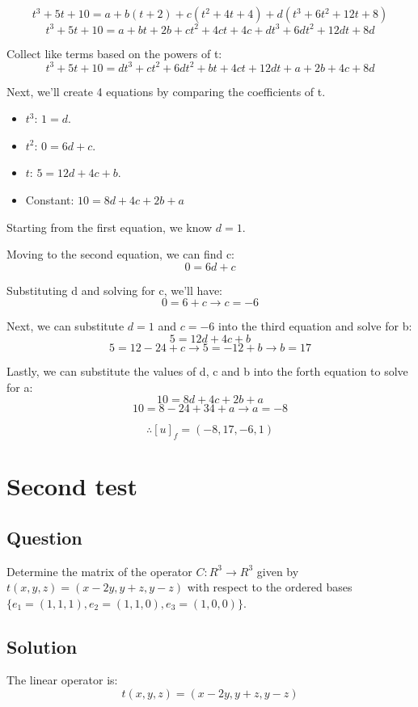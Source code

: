 \documentclass{book}
\begin{document}
\[t^3 + 5t + 10 = a + b (t + 2) + c (t^2  + 4t + 4) + d(t^3 + 6t^2 + 12t + 8)\]
\[t^3 + 5t + 10 = a + bt + 2b + ct^2  + 4ct + 4c + dt^3 + 6dt^2 + 12dt + 8d\]

Collect like terms based on the powers of t:
\[t^3 + 5t + 10 = dt^3 + ct^2 + 6dt^2 + bt + 4ct + 12dt + a + 2b  + 4c + 8d\]

Next, we'll create 4 equations by comparing the coefficients of t.

\begin{itemize}
	\item \(t^3\): \(1 = d\).
	\item \(t^2\): \(0 = 6d + c\).
	\item \(t\): \(5 = 12d + 4c + b\).
	\item Constant: \(10 = 8d + 4c + 2b + a\)
\end{itemize}

Starting from the first equation, we know \(d = 1\).

Moving to the second equation, we can find c:
\[0 = 6d + c\]

Substituting d and solving for c, we'll have:
\[0 = 6 + c \rightarrow c = -6\]

Next, we can substitute \(d = 1\) and \(c = -6\) into the third equation and solve for b:
\[5 = 12d + 4c + b\]
\[5 = 12 - 24 + c \rightarrow 5 = -12 + b \rightarrow b = 17\]

Lastly, we can substitute the values of d, c and b into the forth equation to solve for a:
\[10 = 8d + 4c + 2b + a\]
\[10 = 8 - 24 + 34 + a \rightarrow a = -8\]

\[\therefore {[u]}_f = (-8, 17, -6, 1)\]

\section{Second test}
\subsection{Question}
Determine the matrix of the operator \(C: R^3 \to R^3\) given by \(t(x, y, z) = (x - 2y, y + z, y - z)\) with respect to the ordered bases \(\{e_1 = (1, 1, 1), e_2 = (1, 1, 0), e_3 = (1, 0, 0)\}\).

\subsection*{Solution}
The linear operator is:
\[t(x, y, z) = (x - 2y, y + z, y - z)\]
\end{document}
